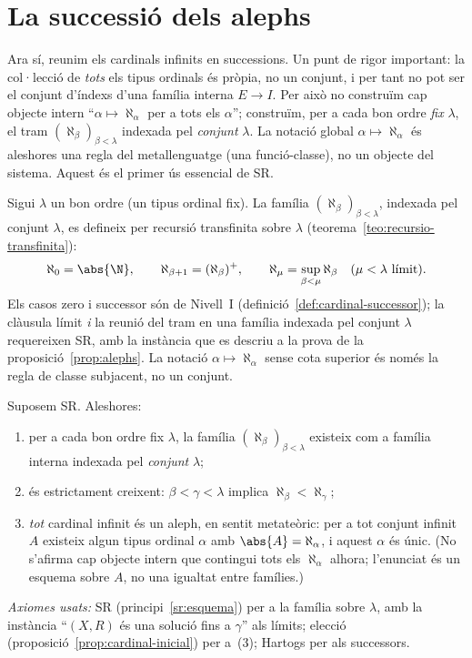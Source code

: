 \section{La successió dels alephs}\label{sec:alephs}

Ara sí, reunim els cardinals infinits en successions. Un punt de rigor
important: la col·lecció de \emph{tots} els tipus ordinals és pròpia, no un
conjunt, i per tant no pot ser el conjunt d'índexs d'una família interna
\(E\to I\). Per això no construïm cap objecte intern
\enquote{\(\alpha\mapsto\aleph_\alpha\) per a tots els \(\alpha\)}; construïm,
per a cada bon ordre \emph{fix} \(\lambda\), el tram
\((\aleph_\beta)_{\beta<\lambda}\) indexada pel \emph{conjunt} \(\lambda\).
La notació global \(\alpha\mapsto\aleph_\alpha\) és aleshores una regla del
metallenguatge (una funció-classe), no un objecte del sistema. Aquest és el
primer ús essencial de SR.

\begin{definicio}\label{def:alephs}
Sigui \(\lambda\) un bon ordre (un tipus ordinal fix). La família
\((\aleph_\beta)_{\beta<\lambda}\), indexada pel conjunt \(\lambda\), es
defineix per recursió transfinita sobre \(\lambda\)
(teorema~\ref{teo:recursio-transfinita}):
\[
\aleph_0=\abs{\N},
\qquad
\aleph_{\beta+1}=(\aleph_\beta)^{+},
\qquad
\aleph_\mu=\sup_{\beta<\mu}\aleph_\beta\quad(\mu<\lambda\ \text{límit}).
\]
Els casos zero i successor són de Nivell~I (definició~\ref{def:cardinal-successor});
la clàusula límit \emph{i} la reunió del tram en una família indexada pel
conjunt \(\lambda\) requereixen SR, amb la instància que es descriu a la
prova de la proposició~\ref{prop:alephs}. La notació
\(\alpha\mapsto\aleph_\alpha\) sense cota superior és només la regla de
classe subjacent, no un conjunt.
\end{definicio}

\begin{proposicio}\label{prop:alephs}
Suposem SR. Aleshores:
\begin{enumerate}
\item per a cada bon ordre fix \(\lambda\), la família
\((\aleph_\beta)_{\beta<\lambda}\) existeix com a família interna indexada pel
\emph{conjunt} \(\lambda\);
\item és estrictament creixent: \(\beta<\gamma<\lambda\) implica
\(\aleph_\beta<\aleph_\gamma\);
\item \emph{tot} cardinal infinit és un aleph, en sentit metateòric: per a
tot conjunt infinit \(A\) existeix algun tipus ordinal \(\alpha\) amb
\(\abs{A}=\aleph_\alpha\), i aquest \(\alpha\) és únic. (No s'afirma cap
objecte intern que contingui tots els \(\aleph_\alpha\) alhora; l'enunciat és
un esquema sobre \(A\), no una igualtat entre famílies.)
\end{enumerate}
\emph{Axiomes usats:} SR (principi~\ref{sr:esquema}) per a la família sobre
\(\lambda\), amb la instància \enquote{\((X,R)\) és una solució fins a
\(\gamma\)} als límits; elecció (proposició~\ref{prop:cardinal-inicial}) per
a~(3); Hartogs per als successors.
\end{proposicio}

